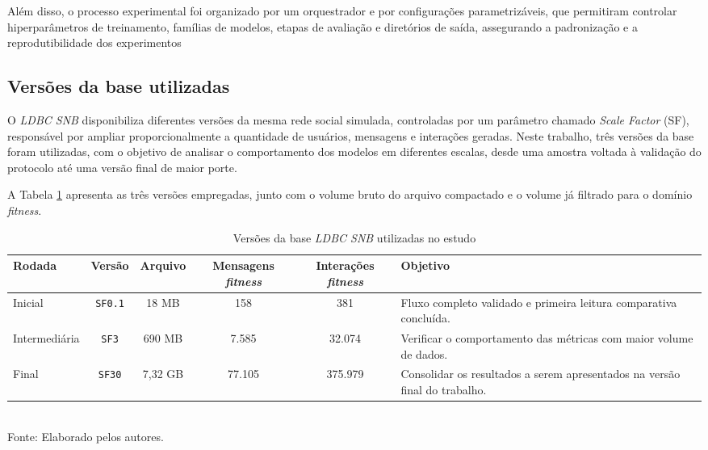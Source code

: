 \documentclass[a4paper,12pt]{article}
\begin{document}
Além disso, o processo experimental foi organizado por um orquestrador e por configurações parametrizáveis, que permitiram controlar hiperparâmetros de treinamento, famílias de modelos, etapas de avaliação e diretórios de saída, assegurando a padronização e a reprodutibilidade dos experimentos

\subsection{Versões da base utilizadas}
\label{subsec:versoes_base}

O \textit{LDBC SNB} disponibiliza diferentes versões da mesma rede social simulada, controladas por um parâmetro chamado \textit{Scale Factor} (SF), responsável por ampliar proporcionalmente a quantidade de usuários, mensagens e interações geradas. Neste trabalho, três versões da base foram utilizadas, com o objetivo de analisar o comportamento dos modelos em diferentes escalas, desde uma amostra voltada à validação do protocolo até uma versão final de maior porte.

A Tabela \ref{tab:rodadas_execucao_tcc} apresenta as três versões empregadas, junto com o volume bruto do arquivo compactado e o volume já filtrado para o domínio \textit{fitness}.

\begin{table}[H]
\centering
\caption{Versões da base \textit{LDBC SNB} utilizadas no estudo}
\label{tab:rodadas_execucao_tcc}
\small
\begin{tabular}{|p{2.0cm}|c|c|c|c|p{3.7cm}|}
\hline
\textbf{Rodada} & \textbf{Versão} & \textbf{Arquivo} & \textbf{Mensagens \textit{fitness}} & \textbf{Interações \textit{fitness}} & \textbf{Objetivo} \\
\hline
Inicial & \texttt{SF0.1} & 18 MB & 158 & 381 & Fluxo completo validado e primeira leitura comparativa concluída. \\
\hline
Intermediária & \texttt{SF3} & 690 MB & 7.585 & 32.074 & Verificar o comportamento das métricas com maior volume de dados. \\
\hline
Final & \texttt{SF30} & 7,32 GB & 77.105 & 375.979 & Consolidar os resultados a serem apresentados na versão final do trabalho. \\
\hline
\end{tabular}
\small \\ Fonte: Elaborado pelos autores.
\end{table}
\end{document}

